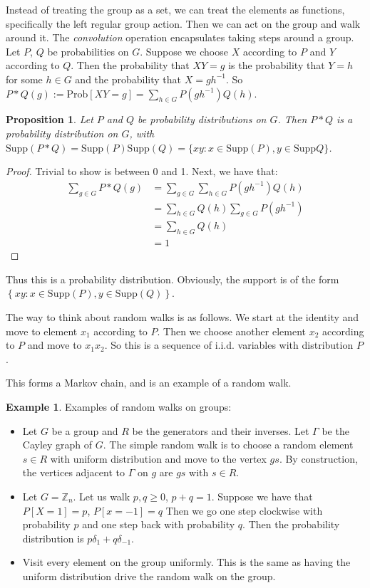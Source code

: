 \documentclass[]{article}
\newtheorem{proposition}[theorem]{Proposition}
\theoremstyle{definition}
\newtheorem{example}[theorem]{Example}
\numberwithin{theorem}{section}
\numberwithin{equation}{section}
\newcommand{\supp}{\text{Supp}}
\begin{document}
Instead of treating the group as a set, we can treat the elements as functions, specifically the left regular group action. Then we can act on the group and walk around it. The \textit{convolution} operation encapsulates taking steps around a group.
Let $P$, $Q$ be probabilities on $G$. Suppose we choose $X$ according to $P$ and $Y$ according to $Q$. Then the probability that $XY = g$ is the probability that $Y = h$ for some $h \in G$ and the probability that $X = gh^{-1}$. 
So $P \ast Q(g) := \text{Prob}[XY = g] = \sum_{h\in G} P(gh^{-1})Q(h) $.

\begin{proposition}
	Let $P$ and $Q$ be probability distributions on $G$. Then $P \ast Q$ is a probability distribution on $G$, with $\supp(P \ast Q) = \supp(P)\supp(Q) = \lbrace xy : x \in \supp(P), y \in \supp Q \rbrace$. 
\end{proposition}
\begin{proof}
	Trivial to show is between 0 and 1.
	Next, we have that:
	\begin{align*}
		\sum_{g \in G} P \ast Q(g) &= \sum_{g \in G} \sum_{h \in G} P(gh^{-1}) Q(h)\\
		&=\sum_{h \in G} Q(h) \sum_{g \in G} P(gh^{-1})\\
		&= \sum_{h \in G} Q(h)\\
		&= 1
	\end{align*}
\end{proof}
Thus this is a probability distribution. Obviously, the support is of the form $\left\{ xy : x \in \supp(P), y \in \supp(Q) \right\}$. 

The way to think about random walks is as follows. We start at the identity and move to element $x_1$ according to $P$. Then we choose another element $x_2$ according to $P$ and move to $x_1 x_2$. So this is a sequence of i.i.d. variables with distribution $P$.

This forms a Markov chain, and is an example of a random walk.

\begin{example}
	Examples of random walks on groups:
	\begin{itemize}
		\item Let $G$ be a group and $R$ be the generators and their inverses. Let $\Gamma$ be the Cayley graph of $G$. The simple random walk is to choose a random element $s \in R$ with uniform distribution and move to the vertex $gs$. By construction, the vertices adjacent to $\Gamma$ on $g$ are $gs$ with $s \in R$.
		\item Let $G = \mathbb{Z}_n$. Let us walk  $p, q \geq 0$, $p + q = 1$. Suppose we have that $P[X = 1] = p$, $P[x = -1] = q$ Then we go one step clockwise with probability $p$ and one step back with probability $q$. Then the probability distribution is $p \delta_1 + q \delta_{-1}$. 
		\item Visit every element on the group uniformly. This is the same as having the uniform distribution drive the random walk on the group.
	\end{itemize}
\end{example}
\end{document}
